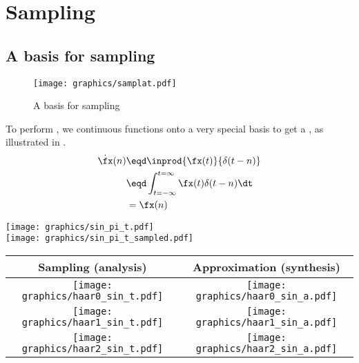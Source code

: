 ﻿%
\chapter{Sampling}

\section{A basis for sampling}
\begin{figure}[h]
  \centering
  \texttt{[image: graphics/samplat.pdf]}
\caption{A basis for sampling \label{fig:samplat}}
\end{figure}
  To perform , we  
  continuous functions onto a very special basis
  to get a , as illustrated in .
\begin{align*}
  \dot{\fx}(n)
    &\eqd \inprod{\fx(t)}{\delta(t-n)}
  \\&\eqd \int_{t=-\infty}^{t=\infty} \fx(t)\delta(t-n) \dt
  \\&=    \fx(n)
\end{align*}


\texttt{[image: graphics/sin\_pi\_t.pdf]}\\
\texttt{[image: graphics/sin\_pi\_t\_sampled.pdf]}


  \begin{tabular}{|c|c|}
    \hline
    Sampling (analysis) & Approximation (synthesis)
    \\\hline\hline
      \texttt{[image: graphics/haar0\_sin\_t.pdf]}
    & \texttt{[image: graphics/haar0\_sin\_a.pdf]}
    \\\hline
      \texttt{[image: graphics/haar1\_sin\_t.pdf]}
    & \texttt{[image: graphics/haar1\_sin\_a.pdf]}
    \\\hline
      \texttt{[image: graphics/haar2\_sin\_t.pdf]}
    & \texttt{[image: graphics/haar2\_sin\_a.pdf]}
    \\\hline
  \end{tabular}

